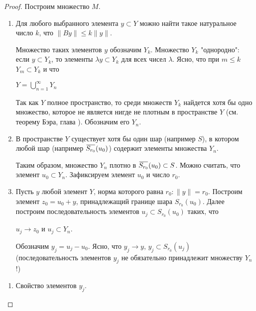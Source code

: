 \documentclass[12pt,a4paper,titlepage, oneside]{book}
\newcommand{\overbar}[1]{\mkern 1.5mu\overline{\mkern-1.5mu#1\mkern-1.5mu}\mkern 1.5mu}
\theoremstyle{definition}
\theoremstyle{plain}
\theoremstyle{remark}
\theoremstyle{remark}
\theoremstyle{remark}
\theoremstyle{remark}
\theoremstyle{plain}
\theoremstyle{plain}
\begin{document}
\begin{proof}
	
Построим множество $M$.

\begin{enumerate}
	\item Для любого выбранного элемента $y \subset Y$ можно найти такое натуральное число $k$, что $\lVert By\rVert \leq k\lVert y\rVert$.
	
	Множество таких элементов $y$ обозначим $Y_k$. Множество $Y_k$ "однородно": если $y \subset Y_k$, то элементы $\lambda y \subset Y_k$ для всех чисел $\lambda$. Ясно, что при $m \leq k$ $Y_m \subset Y_k$ и что

\begin{center}	

	$Y=\bigcup\limits_{n=1}^\infty Y_n$
	
\end{center}
	
	Так как $Y$ полное пространство, то среди множеств $Y_k$ найдется хотя бы одно множество, которое не является нигде не плотным в пространстве $Y$ (см. теорему Бэра, глава \uppercase\expandafter{}). Обозначим его $Y_n$.
	
	\item В пространстве $Y$ существует хотя бы один шар (например $S$), в котором любой шар (например $\overbar{S_{r_0}}(u_0)$) содержит элементы множества $Y_n$.
	
	Таким образом, множество $Y_n$ плотно в $\overbar{S_{r_0}}(u_0)\subset S$. Можно считать, что элемент $u_0 \subset Y_n$. Зафиксируем элемент $u_0$ и число $r_0$.
	
	\item Пусть $y$ любой элемент $Y$, норма которого равна $r_0:\lVert y\rVert=r_0$. Построим элемент $z_0=u_0+y$, принадлежащий границе шара $S_{r_0}(u_0)$. Далее построим последовательность элементов $u_j \subset S_{r_0}(u_0)$ таких, что

\begin{center}	

	$u_j \to z_0$ и $u_j \subset Y_n$.
	
\end{center}

Обозначим $y_j=u_j-u_0$. Ясно, что $y_j \to y$, $y_j \subset S_{r_0}(u_j)$ (последовательность элементов $y_j$ не обязательно принадлежит множеству $Y_n$!)
	
\end{enumerate}


\begin{enumerate}
\item Свойство элементов $y_j$.


\end{enumerate}
\end{proof}
\end{document}
